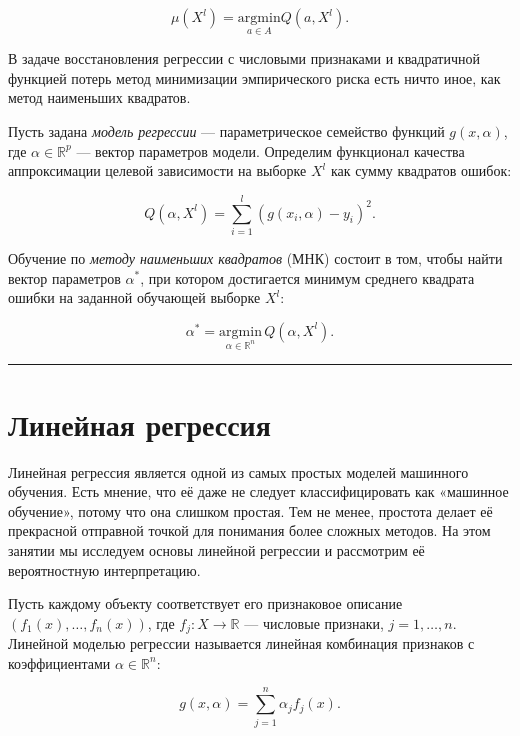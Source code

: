 \documentclass[11pt,a4paper]{article}
\renewcommand{\linethickness}{0.1ex}
\begin{document}
\[ \mu(X^l) = \underset{a \in A}{\mathrm{argmin}} Q(a, X^l). \]

В задаче восстановления регрессии с числовыми признаками и квадратичной
функцией потерь метод минимизации эмпирического риска есть ничто иное,
как метод наименьших квадратов.

Пусть задана \emph{модель регрессии} --- параметрическое семейство
функций \(g(x,\alpha)\), где \(\alpha \in \mathbb{R}^p\) --- вектор
параметров модели. Определим функционал качества аппроксимации целевой
зависимости на выборке \(X^l\) как сумму квадратов ошибок:

\[ Q(\alpha, X^l) = \sum_{i=1}^l \left( g(x_i, \alpha) - y_i \right)^2. \]

Обучение по \emph{методу наименьших квадратов} (МНК) состоит в том,
чтобы найти вектор параметров \(\alpha^*\), при котором достигается
минимум среднего квадрата ошибки на заданной обучающей выборке \(X^l\):

\[ \alpha^* = \underset{\alpha \in \mathbb{R}^n}{\mathrm{argmin}} \, {Q(\alpha, X^l)}. \]

    \begin{center}\rule{0.5\linewidth}{\linethickness}\end{center}

    \hypertarget{ux43bux438ux43dux435ux439ux43dux430ux44f-ux440ux435ux433ux440ux435ux441ux441ux438ux44f}{%
\section{Линейная
регрессия}\label{ux43bux438ux43dux435ux439ux43dux430ux44f-ux440ux435ux433ux440ux435ux441ux441ux438ux44f}}

Линейная регрессия является одной из самых простых моделей машинного
обучения. Есть мнение, что её даже не следует классифицировать как
«машинное обучение», потому что она слишком простая. Тем не менее,
простота делает её прекрасной отправной точкой для понимания более
сложных методов. На этом занятии мы исследуем основы линейной регрессии
и рассмотрим её вероятностную интерпретацию.

Пусть каждому объекту соответствует его признаковое описание
\(\left( f_1(x), \ldots, f_n(x)\right)\), где
\(f_j: X \rightarrow \mathbb{R}\) --- числовые признаки,
\(j = 1, \ldots , n\). Линейной моделью регрессии называется линейная
комбинация признаков с коэффициентами \(\alpha \in \mathbb{R}^n\):

\[ g(x, \alpha) = \sum_{j=1}^n \alpha_j f_j(x). \]
\end{document}
